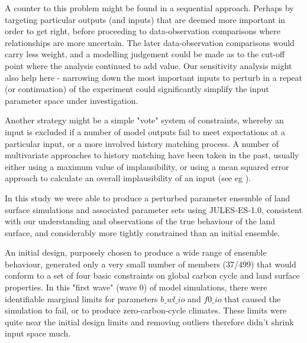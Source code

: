 \documentclass[gmd, manuscript]{copernicus}
\begin{document}
A counter to this problem might be found in a sequential approach. Perhaps by targeting particular outputs (and inputs) that are deemed more important in order to get right, before proceeding to data-observation comparisons where relationships are more uncertain. The later data-observation comparisons would carry less weight, and a modelling judgement could be made as to the cut-off point where the analysis continued to add value. Our sensitivity analysis might also help here - narrowing down the most important inputs to perturb in a repeat (or continuation) of the experiment could significantly simplify the input parameter space under investigation.

Another strategy might be a simple "vote" system of constraints, whereby an input is excluded if a number of model outputs fail to meet expectations at a particular input, or a more involved history matching process. A number of multivariate approaches to history matching have been taken in the past, usually either using a maximum value of implausibility, or using a mean squared error approach to calculate an overall implausibility of an input (see eg \cite{vernon2010galaxy}).

\label{sec:conclusions}  %

In this study we were able to produce a perturbed parameter ensemble of land surface simulations and associated parameter sets using JULES-ES-1.0, consistent with our understanding and observations of the true behaviour of the land surface, and considerably more tightly constrained than an initial ensemble. 

 An initial design, purposely chosen to produce a wide range of ensemble behaviour, generated only a very small number of members (37/499) that would conform to a set of four basic constraints on global carbon cycle and land surface properties. In this "first wave" (wave 0) of model simulations, there were identifiable marginal limits for parameters $b\_wl\_io$ and $f0\_io$ that caused the simulation to fail, or to produce zero-carbon-cycle climates. These limits were quite near the initial design limits and removing outliers therefore didn't shrink input space much.
 
\end{document}
